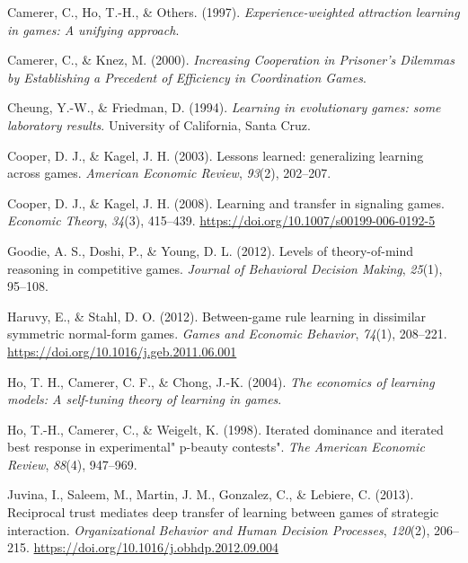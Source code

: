 \documentclass[man,floatsintext]{apa6}
\begin{document}
\leavevmode\hypertarget{ref-camerer1997experience}{}%
Camerer, C., Ho, T.-H., \& Others. (1997). \emph{Experience-weighted attraction learning in games: A unifying approach}.

\leavevmode\hypertarget{ref-knez2000}{}%
Camerer, C., \& Knez, M. (2000). \emph{Increasing Cooperation in Prisoner's Dilemmas by Establishing a Precedent of Efficiency in Coordination Games}.

\leavevmode\hypertarget{ref-cheung1994learning}{}%
Cheung, Y.-W., \& Friedman, D. (1994). \emph{Learning in evolutionary games: some laboratory results}. University of California, Santa Cruz.

\leavevmode\hypertarget{ref-cooper2003lessons}{}%
Cooper, D. J., \& Kagel, J. H. (2003). Lessons learned: generalizing learning across games. \emph{American Economic Review}, \emph{93}(2), 202--207.

\leavevmode\hypertarget{ref-Cooper2008}{}%
Cooper, D. J., \& Kagel, J. H. (2008). Learning and transfer in signaling games. \emph{Economic Theory}, \emph{34}(3), 415--439. \url{https://doi.org/10.1007/s00199-006-0192-5}

\leavevmode\hypertarget{ref-goodie2012levels}{}%
Goodie, A. S., Doshi, P., \& Young, D. L. (2012). Levels of theory-of-mind reasoning in competitive games. \emph{Journal of Behavioral Decision Making}, \emph{25}(1), 95--108.

\leavevmode\hypertarget{ref-Haruvy2012}{}%
Haruvy, E., \& Stahl, D. O. (2012). Between-game rule learning in dissimilar symmetric normal-form games. \emph{Games and Economic Behavior}, \emph{74}(1), 208--221. \url{https://doi.org/10.1016/j.geb.2011.06.001}

\leavevmode\hypertarget{ref-ho2004economics}{}%
Ho, T. H., Camerer, C. F., \& Chong, J.-K. (2004). \emph{The economics of learning models: A self-tuning theory of learning in games}.

\leavevmode\hypertarget{ref-ho1998iterated}{}%
Ho, T.-H., Camerer, C., \& Weigelt, K. (1998). Iterated dominance and iterated best response in experimental" p-beauty contests". \emph{The American Economic Review}, \emph{88}(4), 947--969.

\leavevmode\hypertarget{ref-Juvina2013}{}%
Juvina, I., Saleem, M., Martin, J. M., Gonzalez, C., \& Lebiere, C. (2013). Reciprocal trust mediates deep transfer of learning between games of strategic interaction. \emph{Organizational Behavior and Human Decision Processes}, \emph{120}(2), 206--215. \url{https://doi.org/10.1016/j.obhdp.2012.09.004}
\end{document}
